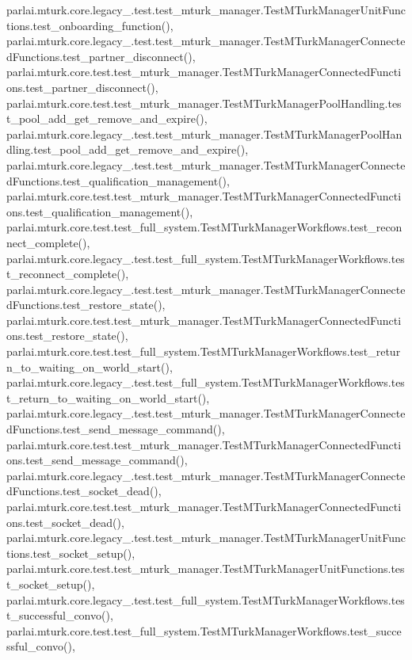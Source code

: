 parlai.\+mturk.\+core.\+legacy\+\_.\+test.\+test\+\_\+mturk\+\_\+manager.\+Test\+M\+Turk\+Manager\+Unit\+Functions.\+test\+\_\+onboarding\+\_\+function(), parlai.\+mturk.\+core.\+legacy\+\_.\+test.\+test\+\_\+mturk\+\_\+manager.\+Test\+M\+Turk\+Manager\+Connected\+Functions.\+test\+\_\+partner\+\_\+disconnect(), parlai.\+mturk.\+core.\+test.\+test\+\_\+mturk\+\_\+manager.\+Test\+M\+Turk\+Manager\+Connected\+Functions.\+test\+\_\+partner\+\_\+disconnect(), parlai.\+mturk.\+core.\+test.\+test\+\_\+mturk\+\_\+manager.\+Test\+M\+Turk\+Manager\+Pool\+Handling.\+test\+\_\+pool\+\_\+add\+\_\+get\+\_\+remove\+\_\+and\+\_\+expire(), parlai.\+mturk.\+core.\+legacy\+\_.\+test.\+test\+\_\+mturk\+\_\+manager.\+Test\+M\+Turk\+Manager\+Pool\+Handling.\+test\+\_\+pool\+\_\+add\+\_\+get\+\_\+remove\+\_\+and\+\_\+expire(), parlai.\+mturk.\+core.\+legacy\+\_.\+test.\+test\+\_\+mturk\+\_\+manager.\+Test\+M\+Turk\+Manager\+Connected\+Functions.\+test\+\_\+qualification\+\_\+management(), parlai.\+mturk.\+core.\+test.\+test\+\_\+mturk\+\_\+manager.\+Test\+M\+Turk\+Manager\+Connected\+Functions.\+test\+\_\+qualification\+\_\+management(), parlai.\+mturk.\+core.\+test.\+test\+\_\+full\+\_\+system.\+Test\+M\+Turk\+Manager\+Workflows.\+test\+\_\+reconnect\+\_\+complete(), parlai.\+mturk.\+core.\+legacy\+\_.\+test.\+test\+\_\+full\+\_\+system.\+Test\+M\+Turk\+Manager\+Workflows.\+test\+\_\+reconnect\+\_\+complete(), parlai.\+mturk.\+core.\+legacy\+\_.\+test.\+test\+\_\+mturk\+\_\+manager.\+Test\+M\+Turk\+Manager\+Connected\+Functions.\+test\+\_\+restore\+\_\+state(), parlai.\+mturk.\+core.\+test.\+test\+\_\+mturk\+\_\+manager.\+Test\+M\+Turk\+Manager\+Connected\+Functions.\+test\+\_\+restore\+\_\+state(), parlai.\+mturk.\+core.\+test.\+test\+\_\+full\+\_\+system.\+Test\+M\+Turk\+Manager\+Workflows.\+test\+\_\+return\+\_\+to\+\_\+waiting\+\_\+on\+\_\+world\+\_\+start(), parlai.\+mturk.\+core.\+legacy\+\_.\+test.\+test\+\_\+full\+\_\+system.\+Test\+M\+Turk\+Manager\+Workflows.\+test\+\_\+return\+\_\+to\+\_\+waiting\+\_\+on\+\_\+world\+\_\+start(), parlai.\+mturk.\+core.\+legacy\+\_.\+test.\+test\+\_\+mturk\+\_\+manager.\+Test\+M\+Turk\+Manager\+Connected\+Functions.\+test\+\_\+send\+\_\+message\+\_\+command(), parlai.\+mturk.\+core.\+test.\+test\+\_\+mturk\+\_\+manager.\+Test\+M\+Turk\+Manager\+Connected\+Functions.\+test\+\_\+send\+\_\+message\+\_\+command(), parlai.\+mturk.\+core.\+legacy\+\_.\+test.\+test\+\_\+mturk\+\_\+manager.\+Test\+M\+Turk\+Manager\+Connected\+Functions.\+test\+\_\+socket\+\_\+dead(), parlai.\+mturk.\+core.\+test.\+test\+\_\+mturk\+\_\+manager.\+Test\+M\+Turk\+Manager\+Connected\+Functions.\+test\+\_\+socket\+\_\+dead(), parlai.\+mturk.\+core.\+legacy\+\_.\+test.\+test\+\_\+mturk\+\_\+manager.\+Test\+M\+Turk\+Manager\+Unit\+Functions.\+test\+\_\+socket\+\_\+setup(), parlai.\+mturk.\+core.\+test.\+test\+\_\+mturk\+\_\+manager.\+Test\+M\+Turk\+Manager\+Unit\+Functions.\+test\+\_\+socket\+\_\+setup(), parlai.\+mturk.\+core.\+legacy\+\_.\+test.\+test\+\_\+full\+\_\+system.\+Test\+M\+Turk\+Manager\+Workflows.\+test\+\_\+successful\+\_\+convo(), parlai.\+mturk.\+core.\+test.\+test\+\_\+full\+\_\+system.\+Test\+M\+Turk\+Manager\+Workflows.\+test\+\_\+successful\+\_\+convo(), 
